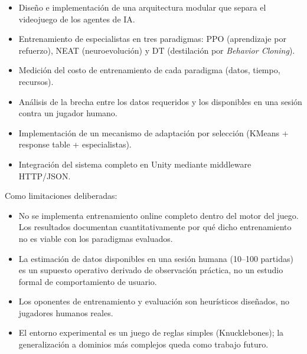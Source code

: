 \begin{itemize}
    \item Diseño e implementación de una arquitectura modular que separa el videojuego de los agentes de IA.
    \item Entrenamiento de especialistas en tres paradigmas: PPO (aprendizaje por refuerzo), NEAT (neuroevolución) y DT (destilación por \textit{Behavior Cloning}).
    \item Medición del costo de entrenamiento de cada paradigma (datos, tiempo, recursos).
    \item Análisis de la brecha entre los datos requeridos y los disponibles en una sesión contra un jugador humano.
    \item Implementación de un mecanismo de adaptación por selección (KMeans + response table + especialistas).
    \item Integración del sistema completo en Unity mediante middleware HTTP/JSON.
\end{itemize}

Como limitaciones deliberadas:

\begin{itemize}
    \item No se implementa entrenamiento online completo dentro del motor del juego. Los resultados documentan cuantitativamente por qué dicho entrenamiento no es viable con los paradigmas evaluados.
    \item La estimación de datos disponibles en una sesión humana (10--100 partidas) es un supuesto operativo derivado de observación práctica, no un estudio formal de comportamiento de usuario.
    \item Los oponentes de entrenamiento y evaluación son heurísticos diseñados, no jugadores humanos reales.
    \item El entorno experimental es un juego de reglas simples (Knucklebones); la generalización a dominios más complejos queda como trabajo futuro.
\end{itemize}

